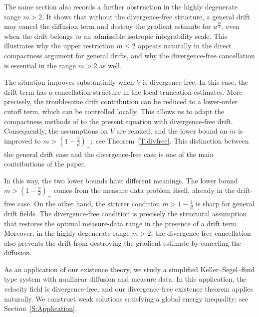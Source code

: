 \documentclass{amsart}
\numberwithin{equation}{section}
\begin{document}
The same section also records a further obstruction in the highly degenerate range \(m>2\). It shows that without the divergence-free structure, a general drift may cancel the diffusion term and destroy the gradient estimate for \(u^{\frac{m}{2}}\), even when the drift belongs to an admissible isotropic integrability scale. This illustrates why the upper restriction \(m\le2\) appears naturally in the direct compactness argument for general drifts, and why the divergence-free cancellation is essential in the range \(m>2\) as well.





The situation improves substantially when \(V\) is divergence-free. In this case, the drift term has a cancellation structure in the local truncation estimates. More precisely, the troublesome drift contribution can be reduced to a lower-order cutoff term, which can be controlled locally. This allows us to adapt the compactness methods of \cite{BDG13,BDG15} to the present equation with divergence-free drift. Consequently, the assumptions on \(V\) are relaxed, and the lower bound on \(m\) is improved to
\(
m>\left(1-\frac{2}{d}\right)_+;
\)
see Theorem~\ref{T:divfree}. This distinction between the general drift case and the divergence-free case is one of the main contributions of the paper.




In this way, the two lower bounds have different meanings. The lower bound
\(
m>\left(1-\frac{2}{d}\right)_+
\)
comes from the measure data problem itself, already in the drift-free case. On the other hand, the stricter condition
\(
m>1-\frac{1}{d}
\)
is sharp for general drift fields. The divergence-free condition is precisely the structural assumption that restores the optimal measure-data range in the presence of a drift term. Moreover, in the highly
degenerate range \(m>2\), the divergence-free cancellation also prevents the
drift from destroying the gradient estimate by canceling the diffusion.





As an application of our existence theory, we study a simplified Keller--Segel--fluid type system with nonlinear diffusion and measure data. In this application, the velocity field is divergence-free, and our divergence-free existence theorem applies naturally. We construct weak solutions satisfying a global energy inequality; see Section~\ref{S:Application}.
\end{document}
